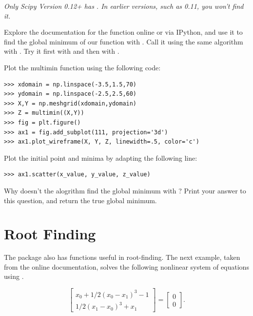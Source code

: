 \emph{Only Scipy Version 0.12+ has . In earlier versions, such as 0.11, you won't find it.}

\begin{problem} %
Explore the documentation for the  function online or via IPython, and use it to find the global minimum of our  function with .
Call it using the same  algorithm with .
Try it first with  and then with . 

Plot the multimin function using the following code:
\begin{lstlisting}
>>> xdomain = np.linspace(-3.5,1.5,70)
>>> ydomain = np.linspace(-2.5,2.5,60)
>>> X,Y = np.meshgrid(xdomain,ydomain)
>>> Z = multimin((X,Y))
>>> fig = plt.figure()
>>> ax1 = fig.add_subplot(111, projection='3d')
>>> ax1.plot_wireframe(X, Y, Z, linewidth=.5, color='c')
\end{lstlisting}

Plot the initial point and minima by adapting the following line:
\begin{lstlisting}
>>> ax1.scatter(x_value, y_value, z_value)     
\end{lstlisting}

Why doesn't the alogrithm find the global minimum with ?
Print your answer to this question, and return the true global minimum.
\end{problem}

\section*{Root Finding} %

The  package also has functions useful in root-finding.
The next example, taken from the online documentation, solves the following nonlinear system of equations using .

\[
\begin{bmatrix}
	x_{0} + 1/2 ( x_{0} - x_{1} )^{3} - 1 \\
	1/2(x_{1}-x_{0})^{3} + x_{1}
\end{bmatrix} =
\begin{bmatrix}
	0 \\
	0
\end{bmatrix}.
\]


